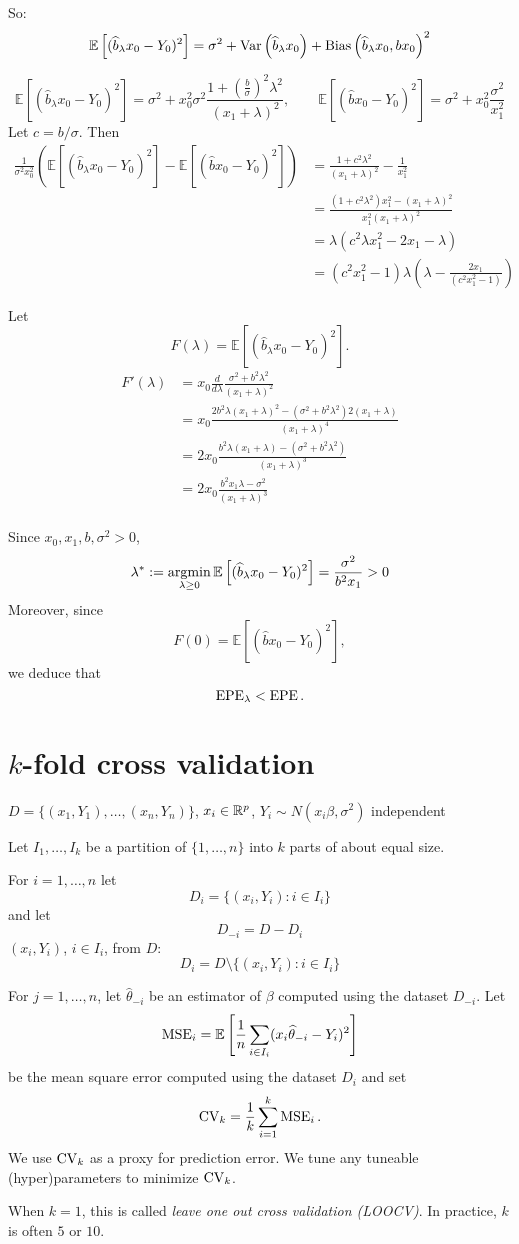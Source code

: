 \documentclass[12pt]{amsart}
\newcommand{\E}[1]{\mathbb{E}\left[#1\right]}
\begin{document}
So:
\[
    \E{(\hat b_\lambda x_0 - Y_0)^2}
    = \sigma^2 + \Var \left(\hat b_\lambda x_0\right) +
    \Bias\left(\hat b_\lambda x_0, bx_0\right)^2
\]

\[
    \E{(\hat b_\lambda x_0 - Y_0)^2} =
    \sigma^2 + x_0^2\sigma^2\frac{1 + (\frac{b}{\sigma})^2\lambda^2}{(x_1 + \lambda)^2},\qquad
    \E{(\hat b x_0 - Y_0)^2} = \sigma^2 + x_0^2\frac{\sigma^2}{x_1^2}
\]
Let $c = b/\sigma$. Then
\begin{align*}
    \frac1{\sigma^2x_0^2}\left(\E{(\hat b_\lambda x_0 - Y_0)^2} 
    - \E{(\hat b x_0 - Y_0)^2}\right)
    &= \frac{1+c^2\lambda^2}{(x_1+\lambda)^2} - \frac1{x_1^2}\\
    &=\frac{(1+c^2\lambda^2)x_1^2 - (x_1+\lambda)^2}{x_1^2(x_1+\lambda)^2}\\
    &=\lambda(c^2\lambda x_1^2 - 2 x_1 - \lambda)\\
    &= (c^2x_1^2 - 1)\lambda\left(\lambda - \frac{2x_1}{(c^2x_1^2 - 1)}\right)
\end{align*}

Let \[F(\lambda) = \E{(\hat b_\lambda x_0 - Y_0)^2}.\]
\begin{align*}
    F'(\lambda) &= x_0\frac d{d\lambda}\frac {\sigma^2 + b^2\lambda^2}{(x_1+\lambda)^2}\\
    &=x_0\frac{2b^2\lambda(x_1+\lambda)^2 
    - (\sigma^2 + b^2\lambda^2)2(x_1 + \lambda)}
    {(x_1+\lambda)^4}\\
    &=2x_0\frac{b^2\lambda(x_1+\lambda) 
    - (\sigma^2 + b^2\lambda^2)}
    {(x_1+\lambda)^3}\\
    &= 2x_0\frac{b^2x_1\lambda - \sigma^2}
    {(x_1+\lambda)^3}\\
\end{align*}

Since $x_0, x_1, b, \sigma^2>0$,
\[
    \lambda^* := \argmin_{\lambda \geq 0} \E{(\hat b_\lambda x_0 - Y_0)^2} = \frac{\sigma^2}{b^2x_1} > 0
\]
Moreover, since
\[
    F(0) = \E{(\hat b x_0 - Y_0)^2},
\]
we deduce that
\[
    \operatorname{EPE}_\lambda < \operatorname{EPE}.
\]

\section{$k$-fold cross validation}

$D = \{(x_1,Y_1),\ldots,(x_n, Y_n)\}$, $x_i\in\mathbb{R}^p$, $Y_i\sim N(x_i\beta, \sigma^2)$ independent

Let $I_1,\ldots,I_k$ be a partition of $\{1,\ldots,n\}$
into $k$ parts of about equal size.

For $i=1,\ldots,n$ let
\[
    D_i = \{(x_i, Y_i) : i\in I_i\}
\]
and let
\[
    D_{-i} = D - D_i
\]
$(x_i, Y_i)$, $i\in I_i$, from $D$:
\[
    D_i = D \setminus \{(x_i, Y_i) : i \in I_i\}
\]

For $j=1,\ldots,n$, let $\hat\theta_{-i}$
be an estimator of $\beta$ computed using the dataset $D_{-i}$.
Let
\[
    \MSE_i = \E{\frac1n\sum_{i\in I_i}(x_i\hat\theta_{-i} - Y_i)^2}
\]
be the mean square error computed using the dataset $D_i$ and set
\[
    \operatorname{CV}_k = \frac1k\sum_{i=1}^k\operatorname{MSE}_i.
\]
We use $\operatorname{CV}_k$ as a proxy for prediction error.
We tune any tuneable (hyper)parameters to minimize $\operatorname{CV}_k$.

When $k=1$, this is called \emph{leave one out cross validation (LOOCV)}.
In practice, $k$ is often $5$ or $10$.
\end{document}
